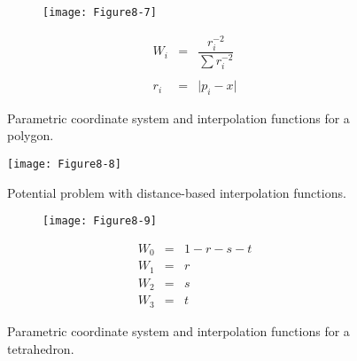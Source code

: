 \begin{description}[leftmargin=0cm,labelindent=0cm]
    \begin{figure}[!htb]
        \centering
        \begin{subfigure}{0.48\linewidth}
            \centering
            \texttt{[image: Figure8-7]}
            \caption*{}
        \end{subfigure}
        \hfill
        \begin{subfigure}{0.48\linewidth}
            \centering
            \begin{equation*}
            \begin{array}{lll}
            W_i &=& \dfrac{r_i^{-2}}{\sum r_i^{-2}} \\ \\
            r_i &=& \vert p_i - x \vert
            \end{array}
            \end{equation*}
        \end{subfigure}%
        \caption{Parametric coordinate system and interpolation functions for a polygon.}
        \label{fig:Figure8-7}
    \end{figure}

    \begin{figure}[!htb]
        \centering
        \texttt{[image: Figure8-8]}\\
        \caption{Potential problem with distance-based interpolation functions.}\label{fig:Figure8-8}
    \end{figure}

    \begin{figure}[!htb]
        \centering
        \begin{subfigure}{0.48\linewidth}
            \centering
            \texttt{[image: Figure8-9]}
            \caption*{}
        \end{subfigure}
        \hfill
        \begin{subfigure}{0.48\linewidth}
            \centering
            \begin{equation*}
            \begin{array}{lll}
            W_0 &=& 1 - r - s - t \\
            W_1 &=& r \\
            W_2 &=& s \\
            W_3 &=& t
            \end{array}
            \end{equation*}
        \end{subfigure}%
        \caption{Parametric coordinate system and interpolation functions for a tetrahedron.}
        \label{fig:Figure8-9}
    \end{figure}


\end{description}
